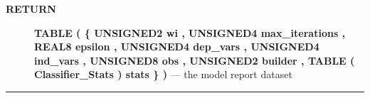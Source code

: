 \par
\begin{description}
\item [\colorbox{tagtype}{\color{white} \textbf{\textsf{RETURN}}}] \textbf{TABLE ( \{ UNSIGNED2 wi , UNSIGNED4 max\_iterations , REAL8 epsilon , UNSIGNED4 dep\_vars , UNSIGNED4 ind\_vars , UNSIGNED8 obs , UNSIGNED2 builder , TABLE ( Classifier\_Stats ) stats \} )} --- the model report dataset
\end{description}




\rule{\linewidth}{0.5pt}
